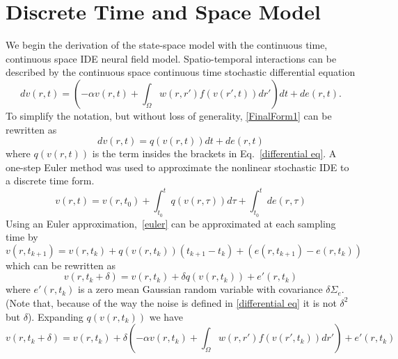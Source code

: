 \documentclass[onecolumn,draftcls]{IEEEtran}
\begin{document}
\section{Discrete Time and Space Model}
We begin the derivation of the state-space model with the continuous time, continuous space IDE neural field model. 
Spatio-temporal interactions can be described by the continuous space continuous time stochastic differential equation
\begin{equation}\label{differential eq}	
dv\left( r,t \right) =  \left( -\alpha v\left( r,t \right) + \int_\Omega  {w\left( r,r' \right)f\left( {v\left( r',t \right)} \right)dr'} \right) dt  + d e\left( r,t \right).
\end{equation}
To simplify the notation, but without loss of generality, \ref{FinalForm1} can be rewritten as
\begin{equation}\label{differential simplified}
	dv\left( r,t \right) = q\left(v\left(r,t\right) \right) dt  + d e\left( r,t \right)
\end{equation}
where $q\left(v\left(r,t\right)\right)$ is the term insides the brackets in Eq.~\ref{differential eq}. A one-step Euler method was used to approximate the nonlinear stochastic IDE to a discrete time form. 
\begin{equation}\label{euler}
	v\left(r,t\right) =  v(r,t_0) + \int_{t_0}^{t} q\left(v(r,\tau) \right) d\tau  + \int_{t_0}^{t} d e\left(r,\tau\right)
\end{equation}
Using an Euler approximation,~\ref{euler} can be approximated at each sampling time by
\begin{equation}\label{euler approx 1}
	v\left(r,t_{k+1} \right) =  v(r,t_k) + q\left(v(r,t_k)\right) (t_{k+1} - t_k) + (e(r,t_{k+1}) - e(r,t_k))
\end{equation}
which can be rewritten as
\begin{equation}\label{euler approx 2}
	v\left(r,t_k + \delta \right) =  v(r,t_k) + \delta q\left(v(r,t_k)\right) + e'(r,t_k)
\end{equation}
where $e'(r,t_k)$ is a zero mean Gaussian random variable with covariance $\delta\Sigma_e$. (Note that, because of the way the noise is defined in \ref{differential eq} it is not $\delta^2$ but $\delta$). Expanding $q\left(v(r,t_k)\right)$ we have
\begin{equation}\label{discrete time model}
	v\left(r,t_k + \delta \right) =  v(r,t_k) + \delta  \left( -\alpha v\left( r,t_k \right) + \int_\Omega  {w\left( r,r' \right)f\left( {v\left( r',t_k \right)} \right)dr'} \right) + e'(r,t_k)
\end{equation}
\end{document}
